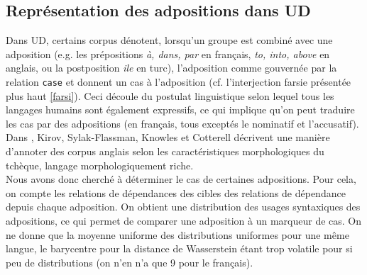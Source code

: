 \documentclass{cours}
\begin{document}
\subsection{Représentation des adpositions dans UD}\label{subsec:adpos}
Dans UD, certains corpus dénotent, lorsqu'un groupe est combiné avec une adposition (e.g. les prépositions \textsl{à, dans, par} en français, \textsl{to, into, above} en anglais, ou la postposition \textsl{ile} en turc), l'adposition comme gouvernée par la relation \texttt{case} et donnent un cas à l'adposition (cf. l'interjection farsie présentée plus haut \ref{farsi}).
Ceci découle du postulat linguistique selon lequel tous les langages humains sont également expressifs, ce qui implique qu'on peut traduire les cas par des adpositions (en français, tous exceptés le nominatif et l'accusatif).
Dans \cite{morphenglish}, Kirov, Sylak-Flassman, Knowles et Cotterell décrivent une manière d'annoter des corpus anglais selon les caractéristiques morphologiques du tchèque, langage morphologiquement riche. \\
Nous avons donc cherché à déterminer le cas de certaines adpositions.
Pour cela, on compte les relations de dépendances des cibles des relations de dépendance depuis chaque adposition.
On obtient une distribution des usages syntaxiques des adpositions, ce qui permet de comparer une adposition à un marqueur de cas.
On ne donne que la moyenne uniforme des distributions uniformes pour une même langue, le barycentre pour la distance de Wasserstein étant trop volatile pour si peu de distributions (on n'en n'a que 9 pour le français).
\end{document}
